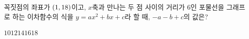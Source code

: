 꼭짓점의 좌표가 $(1{,}\mkern3mu 18)$이고, $x$축과 만나는 두 점 사이의 거리가 $6$인 포물선을 그래프로 하는 이차함수의 식을 $y=ax^2+bx+c$라 할 때, $-a-b+c$의 값은? 
\begin{choices32}{$10$}{$12$}{$14$}{$16$}{$18$}\end{choices32}
